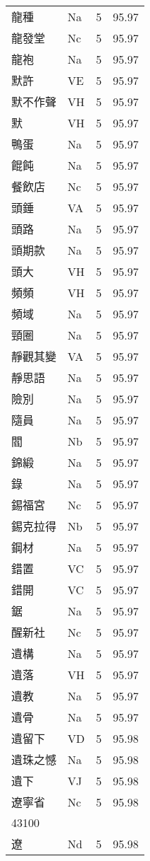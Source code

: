 \documentclass[twocolumn]{book}
\begin{document}
\begin{supertabular}{llrr}
龍種 & Na & 5 &  95.97\\
龍發堂 & Nc & 5 &  95.97\\
龍袍 & Na & 5 &  95.97\\
默許 & VE & 5 &  95.97\\
默不作聲 & VH & 5 &  95.97\\
默 & VH & 5 &  95.97\\
鴨蛋 & Na & 5 &  95.97\\
餛飩 & Na & 5 &  95.97\\
餐飲店 & Nc & 5 &  95.97\\
頭錘 & VA & 5 &  95.97\\
頭路 & Na & 5 &  95.97\\
頭期款 & Na & 5 &  95.97\\
頭大 & VH & 5 &  95.97\\
頻頻 & VH & 5 &  95.97\\
頻域 & Na & 5 &  95.97\\
頸圈 & Na & 5 &  95.97\\
靜觀其變 & VA & 5 &  95.97\\
靜思語 & Na & 5 &  95.97\\
險別 & Na & 5 &  95.97\\
隨員 & Na & 5 &  95.97\\
閻 & Nb & 5 &  95.97\\
錦緞 & Na & 5 &  95.97\\
錄 & Na & 5 &  95.97\\
錫福宮 & Nc & 5 &  95.97\\
錫克拉得 & Nb & 5 &  95.97\\
鋼材 & Na & 5 &  95.97\\
錯置 & VC & 5 &  95.97\\
錯開 & VC & 5 &  95.97\\
鋸 & Na & 5 &  95.97\\
醒新社 & Nc & 5 &  95.97\\
遺構 & Na & 5 &  95.97\\
遺落 & VH & 5 &  95.97\\
遺教 & Na & 5 &  95.97\\
遺骨 & Na & 5 &  95.97\\
遺留下 & VD & 5 &  95.98\\
遺珠之憾 & Na & 5 &  95.98\\
遺下 & VJ & 5 &  95.98\\
遼寧省 & Nc & 5 &  95.98\\
43100\\
遼 & Nd & 5 &  95.98\\

\end{supertabular}
\end{document}
